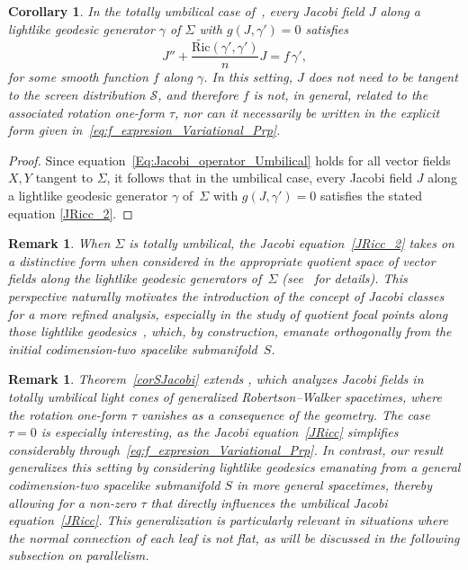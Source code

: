 \documentclass[11pt]{article}
\numberwithin{equation}{section}
\newtheorem{corollary}[theorem]{Corollary}
\newtheorem{remark}[theorem]{Remark}
\begin{document}
	\begin{corollary}\label{cor:umbilical-jacobi}
		In the totally umbilical case of~, every Jacobi field $J$ along a lightlike geodesic generator $\gamma$ of $\Sigma$ with $g(J, \gamma') = 0$ satisfies
		\begin{equation}\label{JRicc_2}
			J'' + \frac{\widetilde{\mathrm{Ric}}(\gamma',\gamma')}{n} J = f\, \gamma',
		\end{equation}
		for some smooth function $f$ along $\gamma$. In this setting, $J$ does not need to be tangent to the screen distribution $\mathcal{S}$, and therefore $f$ is not, in general, related to the associated rotation one-form $\tau$, nor can it necessarily be written in the explicit form given in~\eqref{eq:f_expresion_Variational_Prp}.
	\end{corollary}
	\begin{proof}
		Since equation~\eqref{Eq:Jacobi_operator_Umbilical} holds for all vector fields $X, Y$ tangent to $\Sigma$, it follows that in the umbilical case, every Jacobi field $J$ along a lightlike geodesic generator $\gamma$ of~$\Sigma$ with $g(J, \gamma') = 0$ satisfies the stated equation \eqref{JRicc_2}.
	\end{proof}
	
	

	
\begin{remark}\normalfont
	When $\Sigma$ is totally umbilical, the Jacobi equation~\eqref{JRicc_2} takes on a distinctive form when considered in the appropriate quotient space of vector fields along the lightlike geodesic generators of~$\Sigma$ (see~\cite{beem, MinguzziSanchez} for details). This perspective naturally motivates the introduction of the concept of \emph{Jacobi classes} for a more refined analysis, especially in the study of \emph{quotient focal points} along those lightlike geodesics~\cite{beem}, which, by construction, emanate orthogonally from the initial codimension-two spacelike submanifold~$S$.
\end{remark}
	
		\begin{remark}\normalfont
		Theorem~\ref{corSJacobi} extends \cite[Prop.~3.6]{gutierrez15}, which analyzes Jacobi fields in totally umbilical light cones of generalized Robertson--Walker spacetimes, where the rotation one-form $\tau$ vanishes as a consequence of the geometry. The case $\tau = 0$ is especially interesting, as the Jacobi equation~\eqref{JRicc} simplifies considerably through~\eqref{eq:f_expresion_Variational_Prp}. In contrast, our result generalizes this setting by considering lightlike geodesics emanating from a general codimension-two spacelike submanifold $S$ in more general spacetimes, thereby allowing for a non-zero $\tau$ that directly influences the umbilical Jacobi equation~\eqref{JRicc}. This generalization is particularly relevant in situations where the normal connection of each leaf is not flat, as will be discussed in the following subsection on parallelism.
	\end{remark}
	
\end{document}
